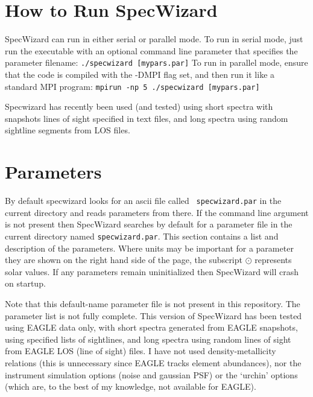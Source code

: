 \documentclass{report}
\begin{document}
\chapter{How to Run SpecWizard}

SpecWizard can run in either serial or parallel mode.  To run in serial mode, just run the executable with an optional command line parameter that specifies the parameter filename:
\linebreak\linebreak
{\tt ./specwizard [mypars.par]}
\linebreak\linebreak
To run in parallel mode, ensure that the code is compiled with the -DMPI flag set, and then run it like a standard MPI program:
\linebreak\linebreak
{\tt mpirun -np 5 ./specwizard [mypars.par]}
\linebreak\linebreak

Specwizard has recently been used (and tested) using short spectra with snapshots lines of sight specified in text files, and long spectra using random sightline segments from LOS files. 

\chapter{Parameters}

By default specwizard looks for an ascii file called {\tt
  specwizard.par} in the current directory and reads parameters from
there.  If the command line argument is not present then SpecWizard
searches by default for a parameter file in the current directory
named {\tt specwizard.par}.  This section contains a %
list and description of the parameters.  Where units may be important for a
parameter they are shown on the right hand side of the page, the
subscript ${\odot}$ represents solar values.  If any parameters remain
uninitialized then SpecWizard will crash on startup.  \linebreak

Note that this default-name parameter file is not present in this repository. The parameter list is not fully complete. This version of SpecWizard has been tested using EAGLE data only, with short spectra generated from EAGLE snapshots, using specified lists of sightlines, and long spectra using random lines of sight from EAGLE LOS (line of sight) files. I have not used density-metallicity relations (this is unnecessary since EAGLE tracks element abundances), nor the instrument simulation options (noise and gaussian PSF) or the `urchin' options (which are, to the best of my knowledge, not available for EAGLE). 
\end{document}
